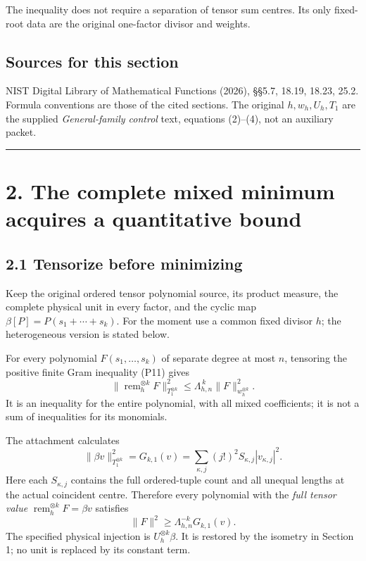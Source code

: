 \documentclass[11pt]{article}
\begin{document}
The inequality does not require a separation of tensor sum centres. Its only fixed-root data are the original one-factor divisor and weights.

\subsection{Sources for this section}\label{sources-for-this-section}

NIST Digital Library of Mathematical Functions (2026), §§5.7, 18.19, 18.23, 25.2. Formula conventions are those of the cited sections. The original \(h,w_h,U_h,T_1\) are the supplied \emph{General-family control} text, equations (2)--(4), not an auxiliary packet.

\begin{center}\rule{0.5\linewidth}{0.5pt}\end{center}

\section{2. The complete mixed minimum acquires a quantitative bound}\label{the-complete-mixed-minimum-acquires-a-quantitative-bound}

\subsection{2.1 Tensorize before minimizing}\label{tensorize-before-minimizing}

Keep the original ordered tensor polynomial source, its product measure, the complete physical unit in every factor, and the cyclic map \(\beta[P]=P(s_1+\cdots+s_k)\). For the moment use a common fixed divisor \(h\); the heterogeneous version is stated below.

For every polynomial \(F(s_1,\ldots,s_k)\) of separate degree at most \(n\), tensoring the positive finite Gram inequality (P11) gives \[
 \|\operatorname{rem}_h^{\otimes k}F\|_{T_1^{\otimes k}}^2
 \le\Lambda_{h,n}^{\,k}\|F\|_{w_h^{\otimes k}}^2. \tag{J1}
\] It is an inequality for the entire polynomial, with all mixed coefficients; it is not a sum of inequalities for its monomials.

The attachment calculates \[
 \|\beta v\|_{T_1^{\otimes k}}^2=G_{k,1}(v)
 =\sum_{\kappa,j}(j!)^2S_{\kappa,j}|v_{\kappa,j}|^2.
\] Here each \(S_{\kappa,j}\) contains the full ordered-tuple count and all unequal lengths at the actual coincident centre. Therefore every polynomial with the \emph{full tensor value} \(\operatorname{rem}_h^{\otimes k}F=\beta v\) satisfies \[
 \boxed{\|F\|^2\ge\Lambda_{h,n}^{-k}G_{k,1}(v).} \tag{J2}
\] The specified physical injection is \(U_h^{\otimes k}\beta\). It is restored by the isometry in Section 1; no unit is replaced by its constant term.
\end{document}

